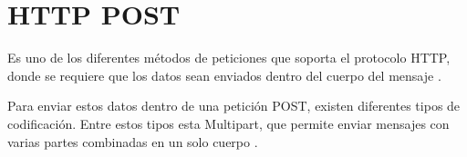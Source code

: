 \section{HTTP POST}\label{HTTP POST}
Es uno de los diferentes métodos de peticiones que soporta el protocolo HTTP, donde se requiere que los datos sean enviados dentro del cuerpo del mensaje \cite{HTTP0}.

Para enviar estos datos dentro de una petición POST, existen diferentes tipos de codificación. Entre estos tipos esta Multipart, que permite enviar mensajes con varias partes combinadas en un solo cuerpo \cite{HTTP1}.